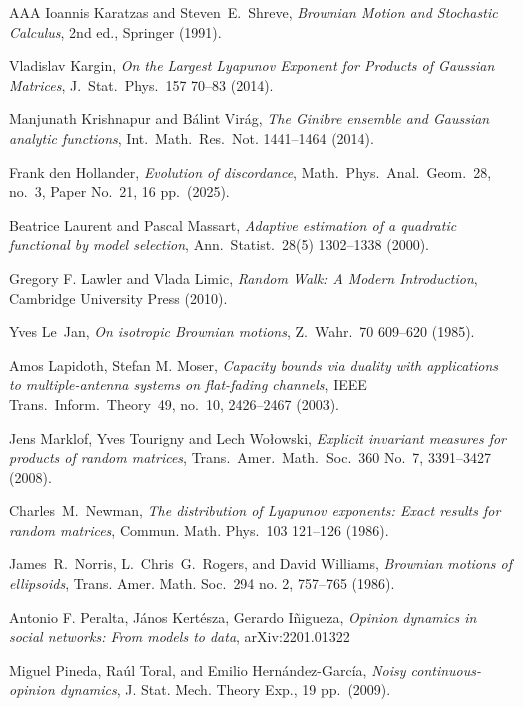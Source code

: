 \documentclass[12pt]{article}
\newcommand{\1}{\mathbf{1}}
\begin{document}
\begin{thebibliography}{AAA}
 Ioannis Karatzas and Steven~E.~Shreve, \emph{Brownian Motion and Stochastic Calculus}, 2nd ed., Springer (1991).

 Vladislav Kargin, \emph{On the Largest Lyapunov Exponent for Products of Gaussian Matrices}, J.~Stat.~Phys.~{157} 70--83 (2014).

 Manjunath Krishnapur and B\'alint Vir\'ag, \emph{The Ginibre ensemble and Gaussian analytic functions}, Int.~Math.~Res.~Not.  1441--1464 (2014). 

 Frank den Hollander, \emph{Evolution of discordance}, Math.\ Phys.\ Anal.\ Geom.~{28}, no.~3, Paper No.~21, 16 pp.\  (2025).

 Beatrice Laurent and Pascal Massart, \emph{Adaptive estimation of a quadratic functional by model selection}, Ann.\ Statist.~{28}(5) 1302--1338 (2000).

Gregory F. Lawler and Vlada Limic, \emph{Random Walk: A Modern Introduction}, Cambridge University Press (2010).


 Yves Le~Jan, \emph{On isotropic {B}rownian motions}, Z.~Wahr.~{70} 609--620 (1985).  %

 Amos Lapidoth,   Stefan M. Moser, \emph{Capacity bounds via duality with applications to multiple-antenna systems on flat-fading channels}, 
IEEE Trans.\ Inform.\ Theory~49, no.~10,  2426–2467 (2003).

 Jens Marklof, Yves Tourigny and Lech Wo{\l}owski, \emph{Explicit invariant measures for products of random matrices}, Trans.~Amer.~Math.~Soc.~{360} No.~7,  3391--3427 (2008).

 Charles~M.~Newman, \emph{The distribution of Lyapunov exponents: Exact results for random matrices}, Commun. Math. Phys.~{103} 121--126 (1986). 

 James~R.~Norris, L.~Chris~G.~Rogers, and David Williams, \emph{Brownian motions of ellipsoids}, Trans. Amer. Math. Soc.~{294} no. 2, 757--765 (1986).

 Antonio F. Peralta, J\'anos Kert\'esza, Gerardo I\~{n}igueza, \emph{Opinion dynamics in social networks: From models to data}, arXiv:2201.01322

 Miguel Pineda, Raúl Toral, and Emilio Hernández-García, \emph{Noisy continuous-opinion dynamics}, J. Stat. Mech. Theory Exp., 19 pp.\ (2009).


\end{thebibliography}
\end{document}

